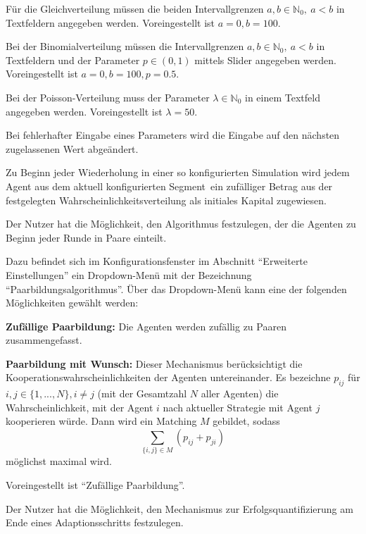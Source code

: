 \documentclass[parskip=full,11pt]{scrartcl}
\def\adapt{Adaptionsschritt}
\def\segment{Segment}
\begin{document}
Für die Gleichverteilung müssen die beiden Intervallgrenzen \(a,b \in \mathbb{N}_0, \ a < b\) in Textfeldern angegeben werden. Voreingestellt ist \(a = 0, b = 100\).

Bei der Binomialverteilung müssen die Intervallgrenzen \(a,b \in \mathbb{N}_0, \ a < b\) in Textfeldern und der Parameter \(p \in (0,1)\) mittels Slider angegeben werden. Voreingestellt ist \(a = 0, b = 100, p = 0.5\).

Bei der Poisson-Verteilung muss der Parameter \(\lambda \in \mathbb{N}_0\) in einem Textfeld angegeben werden. Voreingestellt ist \(\lambda = 50\).

Bei fehlerhafter Eingabe eines Parameters wird die Eingabe auf den nächsten zugelassenen Wert abgeändert.

Zu Beginn jeder Wiederholung in einer so konfigurierten Simulation wird jedem Agent aus dem aktuell konfigurierten \segment\ ein zufälliger Betrag aus der festgelegten Wahrscheinlichkeitsverteilung als initiales Kapital zugewiesen.


Der Nutzer hat die Möglichkeit, den Algorithmus festzulegen, der die Agenten zu Beginn jeder Runde in Paare einteilt.

Dazu befindet sich im Konfigurationsfenster im Abschnitt \enquote{Erweiterte Einstellungen} ein Dropdown-Menü mit der Bezeichnung \enquote{Paarbildungsalgorithmus}. Über das Dropdown-Menü kann eine der folgenden Möglichkeiten gewählt werden:

\textbf{Zufällige Paarbildung:}
Die Agenten werden zufällig zu Paaren zusammengefasst.

\textbf{Paarbildung mit Wunsch:}
Dieser Mechanismus berücksichtigt die Kooperationswahrscheinlichkeiten der Agenten untereinander. Es bezeichne \(p_{ij}\) für \(i,j \in \{1,...,N\}, i \neq j\) (mit der Gesamtzahl \(N\) aller Agenten) die Wahrscheinlichkeit, mit der Agent \(i\) nach aktueller Strategie mit Agent \(j\) kooperieren würde. Dann wird ein Matching \(M\) gebildet, sodass
\[
\sum_{\{i,j\} \in M} \left(p_{ij} + p_{ji}\right)
\]
möglichst maximal wird.

Voreingestellt ist \enquote{Zufällige Paarbildung}.

Der Nutzer hat die Möglichkeit, den Mechanismus zur Erfolgsquantifizierung am Ende eines \adapt s festzulegen.
\end{document}
